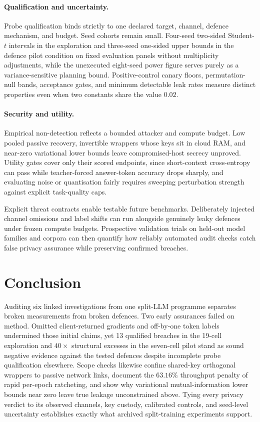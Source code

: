 \paragraph{Qualification and uncertainty.}
Probe qualification binds strictly to one declared target, channel, defence
mechanism, and budget. Seed cohorts remain small. Four-seed two-sided
Student-$t$ intervals in the exploration and three-seed one-sided upper
bounds in the defence pilot condition on fixed evaluation panels without
multiplicity adjustments, while the unexecuted eight-seed power figure
serves purely as a variance-sensitive planning bound. Positive-control
canary floors, permutation-null bands, acceptance gates, and minimum
detectable leak rates measure distinct properties even when two constants
share the value $0.02$.

\paragraph{Security and utility.}
Empirical non-detection reflects a bounded attacker and compute budget. Low
pooled passive recovery, invertible wrappers whose keys sit in cloud RAM,
and near-zero variational lower bounds leave compromised-host secrecy
unproved. Utility gates cover only their scored endpoints, since
short-context cross-entropy can pass while teacher-forced answer-token
accuracy drops sharply, and evaluating noise or quantisation fairly
requires sweeping perturbation strength against explicit task-quality caps.

Explicit threat contracts enable testable future benchmarks. Deliberately
injected channel omissions and label shifts can run alongside genuinely
leaky defences under frozen compute budgets. Prospective validation trials
on held-out model families and corpora can then quantify how reliably
automated audit checks catch false privacy assurance while preserving
confirmed breaches.

\section{Conclusion}

Auditing six linked investigations from one split-LLM programme separates
broken measurements from broken defences. Two early assurances failed on
method. Omitted client-returned gradients and off-by-one token labels
undermined those initial claims, yet 13 qualified breaches in the 19-cell
exploration and $40\times$ structural excesses in the seven-cell pilot
stand as sound negative evidence against the tested defences despite
incomplete probe qualification elsewhere. Scope checks likewise confine
shared-key orthogonal wrappers to passive network links, document the
$63.16\%$ throughput penalty of rapid per-epoch ratcheting, and show why
variational mutual-information lower bounds near zero leave true leakage
unconstrained above. Tying every privacy verdict to its observed channels,
key custody, calibrated controls, and seed-level uncertainty establishes
exactly what archived split-training experiments support.

